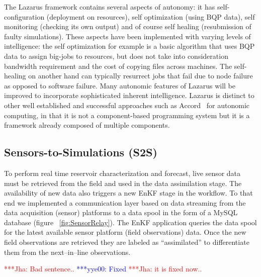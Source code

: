 \documentclass{acm_proc_article-sp}
\newcommand{\jhanote}[1]{ {\textcolor{red} { ***Jha: #1 }}}
\newcommand{\yyenote}[1]{ {\textcolor{blue} { ***yye00: #1 }}}
\newcommand{\jhanote}[1]{}
\newcommand{\yyenote}[1]{}
\begin{document}
The Lazarus framework contains several aspects of autonomy: it has
self-configuration (deployment on resources), self optimization (using
BQP data), self monitoring (checking its own output) and of course
self healing (resubmission of faulty simulations). These aspects have
been implemented with varying levels of intelligence: the self
optimization for example is a basic algorithm that uses BQP data to
assign big-jobs to resources, but does not take into consideration
bandwidth requirement and the cost of copying files across
machines. The self-healing on another hand can typically resurrect
jobs that fail due to node failure as opposed to software
failure. Many autonomic features of Lazarus will be improved to
incorporate sophisticated inherent intelligence.  Lazarus is distinct
to other well established and successful approaches such as
Accord~\cite{accord} for autonomic computing, in that it is not a
component-based programming system but it is a framework already
composed of multiple components.


\subsection{Sensors-to-Simulations (S2S)} 

To perform real time reservoir characterization and forecast, live
sensor data must be retrieved from the field and used in the data
assimilation stage. The availability of new data also triggers a new
EnKF stage in the workflow. To that end we implemented a communication
layer based on data streaming from the data acquisition (sensor)
platforms to a data spool in the form of a MySQL database (figure
~\ref{fig:SensorRelay}). The EnKF application queries the data
spool for the latest available sensor platform (field observations)
data. Once the new field observations are retrieved they are labeled
as ``assimilated'' to differentiate them from the next--in--line
observations.  

\jhanote{Bad sentence..} \yyenote{Fixed} \jhanote{it is fixed now..}

\end{document}
